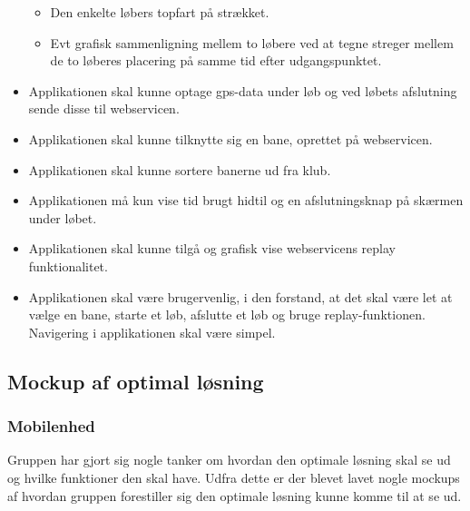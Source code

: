 \begin{itemize}
\begin{itemize}
		\item Den enkelte løbers topfart på strækket.
		\item Evt grafisk sammenligning mellem to løbere ved at tegne streger mellem de to løberes placering på samme tid efter udgangspunktet.
	\end{itemize}
	\item Applikationen skal kunne optage gps-data under løb og ved løbets afslutning sende disse til webservicen.
	\item Applikationen skal kunne tilknytte sig en bane, oprettet på webservicen.
	\item Applikationen skal kunne sortere banerne ud fra klub.
	\item Applikationen må kun vise tid brugt hidtil og en afslutningsknap på skærmen under løbet.
	\item Applikationen skal kunne tilgå og grafisk vise webservicens replay funktionalitet.
	\item Applikationen skal være brugervenlig, i den forstand, at det skal være let at vælge en bane, starte et løb, afslutte et løb og bruge replay-funktionen. Navigering i applikationen skal være simpel.
\end{itemize}

\subsection{Mockup af optimal løsning}
\subsubsection{Mobilenhed}
Gruppen har gjort sig nogle tanker om hvordan den optimale løsning skal se ud og hvilke funktioner den skal have. Udfra dette er der blevet lavet nogle mockups af hvordan gruppen forestiller sig den optimale løsning kunne komme til at se ud.

